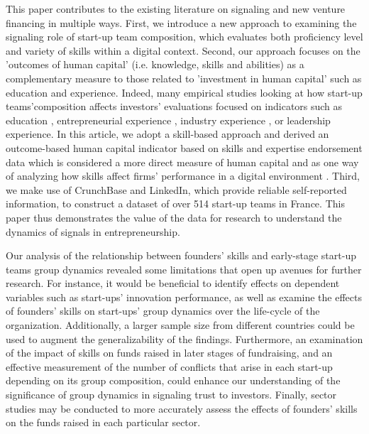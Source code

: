 \documentclass[12pt]{article}
\begin{document}
This paper contributes to the existing literature on signaling and new venture financing in multiple ways. First, we introduce a new approach to examining the signaling role of start-up team composition, which evaluates both proficiency level and variety of skills within a digital context. Second, our approach focuses on the 'outcomes of human capital' (i.e. knowledge, skills and abilities) as a complementary measure to those related to 'investment in human capital' such as education and experience. Indeed, many empirical studies looking at how start-up teams'composition affects investors' evaluations focused on indicators such as education \citep{franke2008venture}, entrepreneurial experience \citep{beckman2007early}, industry experience \citep{becker2015new}, or leadership experience\citep{hoenig2015quality}. In this article, we adopt a skill-based approach and derived an outcome-based human capital indicator based on skills and expertise endorsement data which is considered a more direct measure of human capital and as one way of analyzing how skills affect firms' performance in a digital environment \citep{marvel2016human}. Third, we make use of CrunchBase and LinkedIn, which provide reliable self-reported information, to construct a dataset of over 514 start-up teams in France. This paper thus demonstrates the value of the data for research to understand the dynamics of signals in entrepreneurship.

Our analysis of the relationship between founders' skills and early-stage start-up teams group dynamics revealed some limitations that open up avenues for further research. For instance, it would be beneficial to identify effects on dependent variables such as start-ups' innovation performance, as well as examine the effects of founders' skills on start-ups' group dynamics over the life-cycle of the organization. Additionally, a larger sample size from different countries could be used to augment the generalizability of the findings. Furthermore, an examination of the impact of skills on funds raised in later stages of fundraising, and an effective measurement of the number of conflicts that arise in each start-up depending on its group composition, could enhance our understanding of the significance of group dynamics in signaling trust to investors. Finally, sector studies may be conducted to more accurately assess the effects of founders' skills on the funds raised in each particular sector.
\end{document}
